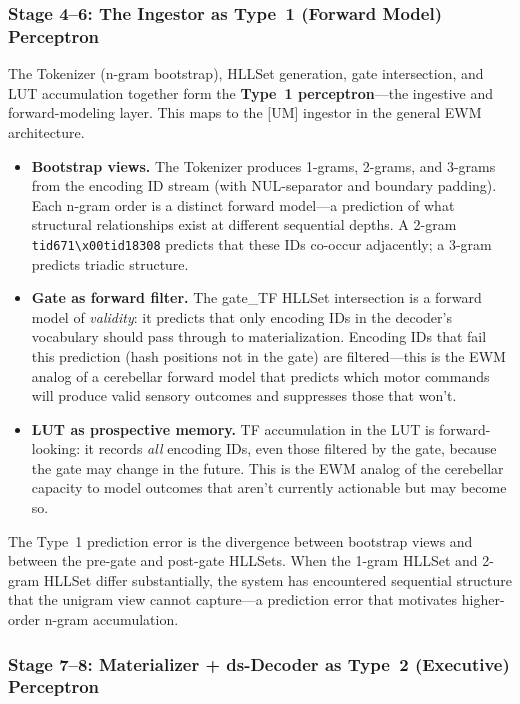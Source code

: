 \documentclass[11pt,a4paper]{article}
\theoremstyle{remark}
\begin{document}
\subsubsection{Stage 4--6: The Ingestor as Type~1 (Forward Model) Perceptron}

The Tokenizer (n-gram bootstrap), HLLSet generation, gate intersection, and LUT
accumulation together form the \textbf{Type~1 perceptron}---the ingestive and
forward-modeling layer. This maps to the [UM] ingestor in the general EWM
architecture.

\begin{itemize}[leftmargin=*,nosep]
  \item \textbf{Bootstrap views.} The Tokenizer produces 1-grams, 2-grams,
    and 3-grams from the encoding ID stream (with NUL-separator and boundary
    padding). Each n-gram order is a distinct forward model---a prediction of
    what structural relationships exist at different sequential depths. A
    2-gram \texttt{tid671\textbackslash x00tid18308} predicts that these IDs
    co-occur adjacently; a 3-gram predicts triadic structure.
  \item \textbf{Gate as forward filter.} The gate\_TF HLLSet intersection is
    a forward model of \textit{validity}: it predicts that only encoding IDs
    in the decoder's vocabulary should pass through to materialization.
    Encoding IDs that fail this prediction (hash positions not in the gate) are
    filtered---this is the EWM analog of a cerebellar forward model that
    predicts which motor commands will produce valid sensory outcomes and
    suppresses those that won't.
  \item \textbf{LUT as prospective memory.} TF accumulation in the LUT is
    forward-looking: it records \textit{all} encoding IDs, even those filtered
    by the gate, because the gate may change in the future. This is the EWM
    analog of the cerebellar capacity to model outcomes that aren't currently
    actionable but may become so.
\end{itemize}

The Type~1 prediction error is the divergence between bootstrap views and
between the pre-gate and post-gate HLLSets. When the 1-gram HLLSet and 2-gram
HLLSet differ substantially, the system has encountered sequential structure
that the unigram view cannot capture---a prediction error that motivates
higher-order n-gram accumulation.

\subsubsection{Stage 7--8: Materializer + ds-Decoder as Type~2 (Executive) Perceptron}
\end{document}
